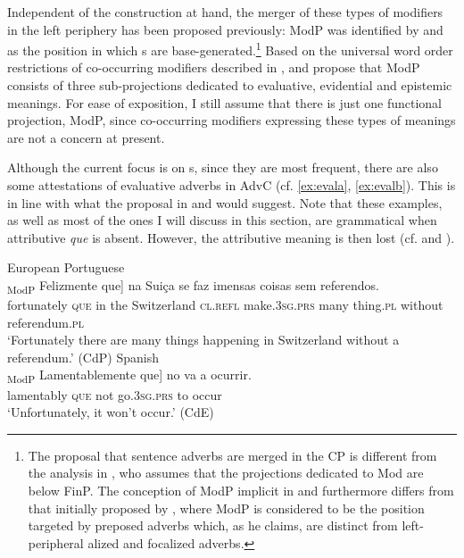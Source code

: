 Independent of the construction at hand, the merger  of these types of modifiers  in the left periphery has been proposed previously: ModP was identified by \citet{Giorgi2010} and \citet{vanGelderen2011} as  the position in which s are base-generated.\footnote{The proposal that sentence adverbs are merged in the CP    is different from the analysis in \citet{Cinque1999}, who assumes that the  projections dedicated to Mod are below FinP. The conception of ModP implicit in \citet{Giorgi2010} and \citet{vanGelderen2011}  furthermore differs from that initially proposed by \citet{Rizzi2004a},  where ModP  is considered to be the position targeted by preposed adverbs which, as he claims, are distinct from left-peripheral alized and focalized adverbs.} Based on the universal word order restrictions of co-occurring modifiers described in \citet{Cinque1999}, \citet{Giorgi2010} and \citet{vanGelderen2011}  propose that ModP consists of three sub-projections dedicated to  evaluative, evidential and epistemic meanings. For ease of exposition, I still assume that there is just one functional projection, ModP, since co-occurring modifiers expressing  these types of meanings are not a concern at  present.  

Although  the current focus is on  s, since they are most frequent, there are also some attestations of evaluative adverbs  in AdvC (cf. \ref{ex:evala}, \ref{ex:evalb}). This is in line with what the proposal in \citet{Giorgi2010} and \citet{vanGelderen2011} would suggest. Note that these examples, as well as most of the ones I will discuss in this section, are grammatical when attributive \emph{que} is absent.  However, the attributive meaning is then lost (cf.  and ).

\ea\label{ex:evala}
European Portuguese\\ 
\gll {\ob}\textsubscript{ModP} Felizmente que] na Suiça se faz imensas coisas sem referendos. \\
{} fortunately \textsc{que} {in the} Switzerland \textsc{cl.refl} make.\textsc{3sg.prs} many thing.\textsc{pl} without referendum.\textsc{pl}\\
\glt `Fortunately there are many things happening in Switzerland without a referendum.' (CdP)
\ex \label{ex:evalb}
		Spanish\\
\gll
{\ob}\textsubscript{ModP} Lamentablemente que] no va a ocurrir. \\
{} lamentably \textsc{que} not go.\textsc{3sg.prs} to occur\\
\glt `Unfortunately, it won't occur.' (CdE)
\z





